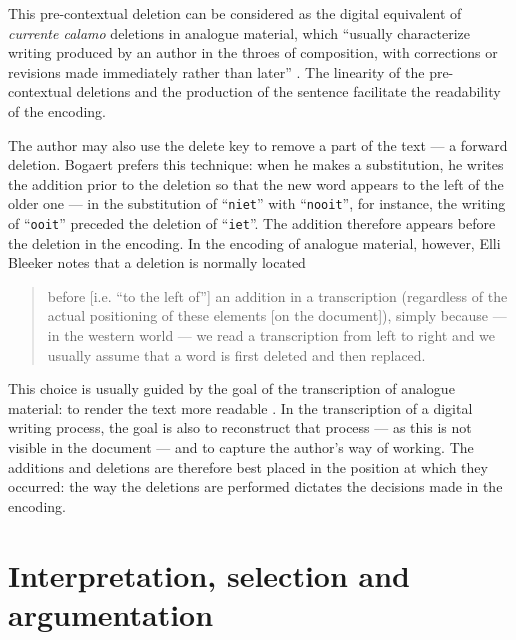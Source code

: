 \begin{paper}
\noindent
This pre-contextual deletion can be considered as the digital equivalent
of \emph{currente calamo} deletions in analogue material, which
``usually characterize writing produced by an author in the throes of
composition, with corrections or revisions made immediately rather than
later'' \citep[104]{beal_dictionary_2011}. The linearity of the pre-contextual deletions
and the production of the sentence facilitate the readability of the
encoding.

The author may also use the delete key to remove a part of the text --- a
forward deletion. Bogaert prefers this technique: when he makes a
substitution, he writes the addition prior to the deletion so that the
new word appears to the left of the older one --- in the substitution of
``\verb|niet|'' with ``\verb|nooit|'', for instance, the writing of ``\verb|ooit|'' preceded
the deletion of ``\verb|iet|''. The addition therefore appears before the
deletion in the encoding. In the encoding of analogue material, however, Elli Bleeker
notes that a deletion is normally located 

\begin{quote}
before [i.e. ``to the left of''] an addition in a
transcription (regardless of the actual positioning of these elements [on the document]),
simply because --- in the western world --- we read a transcription from
left to right and we usually assume that a word is first deleted and
then replaced. 
\begin{flushright}
\citep[98]{bleeker_future_2015}
\end{flushright}
\end{quote}

\noindent 
This choice is usually guided by the
goal of the transcription of analogue material: to render the text more
readable \citep[98]{bleeker_future_2015}. In the transcription of a digital writing
process, the goal is also to reconstruct that process --- as this is not
visible in the document --- and to capture the author's way of working.
The additions and deletions are therefore best placed in the position at
which they occurred: the way the deletions are performed dictates the
decisions made in the encoding.

\section{Interpretation, selection and
argumentation}\label{sec:bekius:interpretation}


\end{paper}
